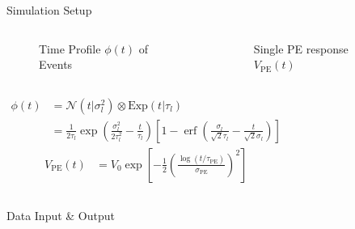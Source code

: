 \documentclass[final]{beamer}
\DeclareMathOperator{\erf}{erf}
\newlength{\colwidth}
\begin{document}
\begin{frame}[t]
\begin{columns}[t]
\begin{column}{\colwidth}
\begin{block}{Simulation Setup}
    \begin{columns}
      \begin{figure}
        \centering
        \resizebox{0.9\textwidth}{!}{}
        \caption{Time Profile $\phi(t)$ of Events}
      \end{figure}
      \begin{figure}
        \centering
        \resizebox{0.9\textwidth}{!}{}
        \caption{Single PE response $V_\mathrm{PE}(t)$\cite{jetter_pmt_2012}}
      \end{figure}
      \end{columns}
    \begin{columns}
    \begin{align*}
        \phi(t) &= \mathcal{N}(t|\sigma_l^2)\otimes \mathrm{Exp}(t|\tau_l) \\
        &= \frac{1}{2\tau_l} \exp\left(\frac{\sigma_l^2}{2\tau_l^2}-\frac{t}{\tau_l}\right) \left[1 - \erf\left( \frac{\sigma_l}{\sqrt{2}\tau_l} - \frac{t}{\sqrt{2}\sigma_l} \right)\right]
    \end{align*}
    \begin{align*}
      V_\mathrm{PE}(t) &= V_{0}\exp\left[-\frac{1}{2}\left(\frac{\log(t/\tau_\mathrm{PE})}{\sigma_\mathrm{PE}}\right)^{2}\right]
    \end{align*}
    \end{columns}

  \end{block}


  \begin{block}{Data Input \& Output}


\end{block}
\end{column}
\end{columns}
\end{frame}
\end{document}
